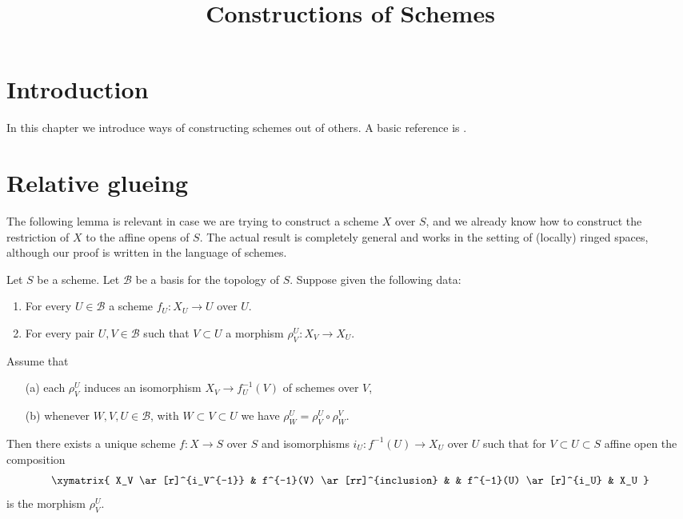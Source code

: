 

%


\title{Constructions of Schemes}


\maketitle

\label{section-phantom}

\tableofcontents

\section{Introduction}
\label{section-introduction}

\noindent
In this chapter we introduce ways of constructing schemes out of others.
A basic reference is \cite{EGA}.





\section{Relative glueing}
\label{section-relative-glueing}

\noindent
The following lemma is relevant in case we are trying to construct a
scheme $X$ over $S$, and we already know how to construct the restriction
of $X$ to the affine opens of $S$. The actual result is completely general
and works in the setting of (locally) ringed spaces, although our proof
is written in the language of schemes.

\begin{lemma}
\label{lemma-relative-glueing}
Let $S$ be a scheme.
Let $\mathcal{B}$ be a basis for the topology of $S$.
Suppose given the following data:
\begin{enumerate}
\item For every $U \in \mathcal{B}$ a scheme $f_U : X_U \to U$ over $U$.
\item For every pair $U, V \in \mathcal{B}$ such that
$V \subset U$ a morphism $\rho^U_V : X_V \to X_U$.
\end{enumerate}
Assume that
\begin{enumerate}
\item[(a)] each $\rho^U_V$ induces an isomorphism
$X_V \to f_U^{-1}(V)$ of schemes over $V$,
\item[(b)] whenever $W, V, U \in \mathcal{B}$, with
$W \subset V \subset U$ we have $\rho^U_W = \rho^U_V \circ \rho ^V_W$.
\end{enumerate}
Then there exists a unique scheme $f : X \to S$ over $S$
and isomorphisms $i_U : f^{-1}(U) \to X_U$ over $U$ such that
for $V \subset U \subset S$ affine open the composition
$$
\xymatrix{
X_V \ar[r]^{i_V^{-1}} &
f^{-1}(V) \ar[rr]^{inclusion} & &
f^{-1}(U) \ar[r]^{i_U} &
X_U
}
$$
is the morphism $\rho^U_V$.
\end{lemma}

